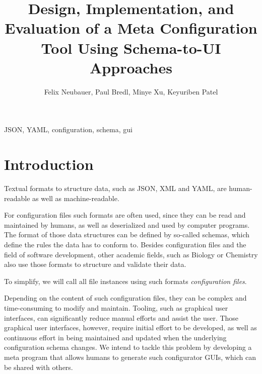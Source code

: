 \documentclass[lettersize,journal]{IEEEtran}
\newcommand{\cfgfiles}{configuration files}
\begin{document}
 \title{Design, Implementation, and Evaluation of a Meta Configuration Tool Using Schema-to-UI Approaches}
 \author{Felix Neubauer, Paul Bredl, Minye Xu, Keyuriben Patel}



 \maketitle

 \begin{abstract}
 \end{abstract}

 \begin{IEEEkeywords}
  JSON, YAML, configuration, schema, gui
 \end{IEEEkeywords}


 \section{Introduction}\label{sec:introduction} %

 Textual formats to structure data, such as JSON, XML and YAML, are human-readable as well as machine-readable.

 For configuration files such formats are often used, since they can be read and maintained by humans, as well as deserialized and used by computer programs.
 The format of those data structures can be defined by so-called schemas, which define the rules the data has to conform to.
 Besides configuration files and the field of software development, other academic fields, such as Biology or Chemistry also use those formats to structure and validate their data.

 To simplify, we will call all file instances using such formats \textit{\cfgfiles}.

 Depending on the content of such \cfgfiles, they can be complex and time-consuming to modify and maintain.
 Tooling, such as graphical user interfaces, can significantly reduce manual efforts and assist the user.
 Those graphical user interfaces, however, require initial effort to be developed, as well as continuous effort in being maintained and updated when the underlying configuration schema changes.
 We intend to tackle this problem by developing a meta program that allows humans to generate such configurator GUIs, which can be shared with others.
\end{document}
